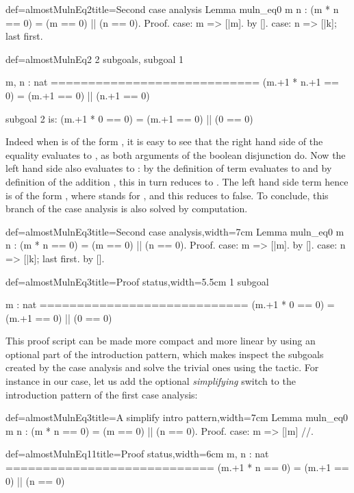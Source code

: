 \begin{coq}{def=almostMulnEq2}{title=Second case analysis}
Lemma muln_eq0 m n : (m * n == 0) = (m == 0) || (n == 0).
Proof.
case: m => [|m].
  by [].
case: n => [|k]; last first.
\end{coq}
\begin{coqout}{def=almostMulnEq2}{}
2 subgoals, subgoal 1

m, n : nat
============================
(m.+1 * n.+1 == 0) = (m.+1 == 0) || (n.+1 == 0)

subgoal 2 is:
 (m.+1 * 0 == 0) = (m.+1 == 0) || (0 == 0)
\end{coqout}
Indeed when  is of the form , it is easy to see that the
right hand side of the equality evaluates to , as both
arguments of the boolean disjunction do. Now the left hand side also
evaluates to : by the definition of  term
 evaluates to  and by
definition of the addition , this in turn reduces to
. The left hand side term hence is of the form
, where  stands for , and this
reduces to false. To conclude, this branch of the case analysis is
also solved by computation.

\begin{coq}{def=almostMulnEq3}{title=Second case analysis,width=7cm}
Lemma muln_eq0 m n :
  (m * n == 0) = (m == 0) || (n == 0).
Proof.
case: m => [|m].
  by [].
case: n => [|k]; last first.
  by [].
\end{coq}
\begin{coqout}{def=almostMulnEq3}{title=Proof status,width=5.5cm}
1 subgoal

m : nat
============================
(m.+1 * 0 == 0) =
  (m.+1 == 0) || (0 == 0)
\end{coqout}

This proof script can be made more compact and more linear by using an
optional part of the introduction pattern, which makes \Coq{}
inspect the subgoals created by the case analysis and solve the
trivial ones using the  tactic. For instance in our case,
let us add the optional \C{//} \emph{simplifying} switch to the
introduction pattern of the first case analysis:

\begin{coq}{def=almostMulnEq3}{title=A simplify intro pattern,width=7cm}
Lemma muln_eq0 m n :
  (m * n == 0) = (m == 0) || (n == 0).
Proof.
case: m => [|m] //.
\end{coq}
\begin{coqout}{def=almostMulnEq11}{title=Proof status,width=6cm}
m, n : nat
============================
(m.+1 * n == 0) =
  (m.+1 == 0) || (n == 0)
\end{coqout}

